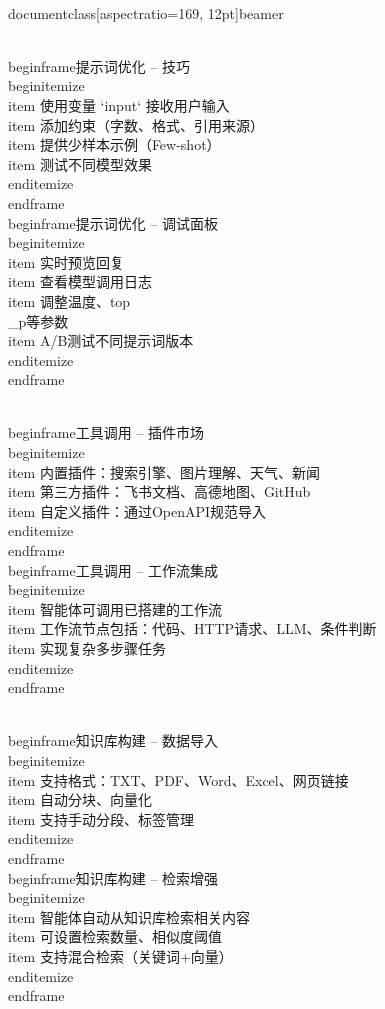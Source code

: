 \\documentclass[aspectratio=169, 12pt]{beamer}
\begin{document}
\\begin{frame}{提示词优化 – 技巧}
\\begin{itemize}
    \\item 使用变量 `{{input}}` 接收用户输入
    \\item 添加约束（字数、格式、引用来源）
    \\item 提供少样本示例（Few-shot）
    \\item 测试不同模型效果
\\end{itemize}
\\end{frame}
\\begin{frame}{提示词优化 – 调试面板}
\\begin{itemize}
    \\item 实时预览回复
    \\item 查看模型调用日志
    \\item 调整温度、top\\_p等参数
    \\item A/B测试不同提示词版本
\\end{itemize}
\\end{frame}

\\begin{frame}{工具调用 – 插件市场}
\\begin{itemize}
    \\item 内置插件：搜索引擎、图片理解、天气、新闻
    \\item 第三方插件：飞书文档、高德地图、GitHub
    \\item 自定义插件：通过OpenAPI规范导入
\\end{itemize}
\\end{frame}
\\begin{frame}{工具调用 – 工作流集成}
\\begin{itemize}
    \\item 智能体可调用已搭建的工作流
    \\item 工作流节点包括：代码、HTTP请求、LLM、条件判断
    \\item 实现复杂多步骤任务
\\end{itemize}
\\end{frame}

\\begin{frame}{知识库构建 – 数据导入}
\\begin{itemize}
    \\item 支持格式：TXT、PDF、Word、Excel、网页链接
    \\item 自动分块、向量化
    \\item 支持手动分段、标签管理
\\end{itemize}
\\end{frame}
\\begin{frame}{知识库构建 – 检索增强}
\\begin{itemize}
    \\item 智能体自动从知识库检索相关内容
    \\item 可设置检索数量、相似度阈值
    \\item 支持混合检索（关键词+向量）
\\end{itemize}
\\end{frame}
\end{document}
